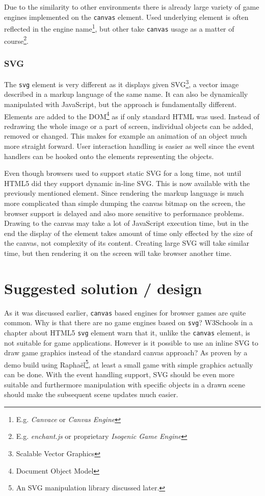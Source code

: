 \documentclass[11pt,oneside, final]{fithesis2}
\begin{document}
Due to the similarity to other environments there is already large variety of game engines implemented on the \texttt{canvas} element. Used underlying element is often reflected in the engine name\footnote{E.g. \emph{Canvace}\cite{canvace} or \emph{Canvas Engine}\cite{canvasengine}}, but other take \texttt{canvas} usage as a matter of course\footnote{E.g. \emph{enchant.js}\cite{enchantjs} or proprietary \emph{Isogenic Game Engine}\cite{isogenic}}.

\subsection{SVG}
The \texttt{svg} element is very different as it displays given SVG\footnote{Scalable Vector Graphics}, a vector image described in a markup language of the same name. It can also be dynamically manipulated with JavaScript, but the approach is fundamentally different. Elements are added to the DOM\footnote{Document Object Model} as if only standard HTML was used. Instead of redrawing the whole image or a part of screen, individual objects can be added, removed or changed. This makes for example an animation of an object much more straight forward. User interaction handling is easier as well since the event handlers can be hooked onto the elements representing the objects.

Even though browsers used to support static SVG for a long time, not until HTML5 did they support dynamic in-line SVG\cite{w3_html5}. This is now available with the previously mentioned element. Since rendering the markup language is much more complicated than simple dumping the canvas bitmap on the screen, the browser support is delayed and also more sensitive to performance problems. Drawing to the canvas may take a lot of JavaScript execution time, but in the end the display of the element takes amount of time only effected by the size of the canvas, not complexity of its content. Creating large SVG will take similar time, but then rendering it on the screen will take browser another time.

\chapter{Suggested solution / design}
\label{solution}
As it was discussed earlier, \texttt{canvas} based engines for browser games are quite common. Why is that there are no game engines based on \texttt{svg}? W3Schools in a chapter about HTML5 \texttt{svg} element warn that it, unlike the \texttt{canvas} element, is not suitable for game applications\cite{html5svg}. However is it possible to use an inline SVG to draw game graphics instead of the standard canvas approach? As proven by a demo build using Raphaël\footnote{An SVG manipulation library discussed later.}, at least a small game with simple graphics actually can be done\cite{raphaelfpsdemo}. With the event handling support, SVG should be even more suitable and furthermore manipulation with specific objects in a drawn scene should make the subsequent scene updates much easier.
\end{document}
